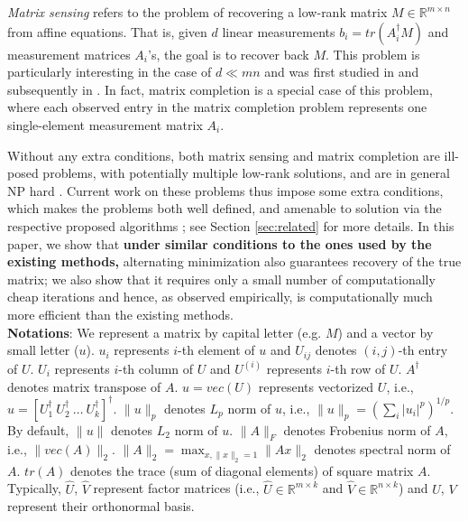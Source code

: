 \documentclass[11pt]{article}
\theoremstyle{plain}
\theoremstyle{definition}
\begin{document}
{\em Matrix sensing} refers to the problem of recovering a low-rank matrix $M\in \mathbb{R}^{m\times n}$ from affine equations. That is, given $d$ linear measurements $b_i = tr(A_i^\dag M)$ and measurement matrices $A_i$'s, the goal is to recover back $M$. This problem is particularly interesting in the case of $d\ll mn$ and was first studied in \cite{RechtFP2007} and subsequently in \cite{JainMD10, LeeB10}. In fact,  matrix completion is a special case of this problem, where each observed entry in the matrix completion problem  represents one single-element measurement matrix $A_i$. 

Without any extra conditions, both  matrix sensing and matrix completion are ill-posed problems, with potentially multiple low-rank solutions, and are in general NP hard \cite{MekaJCD2008}. Current work on these problems thus impose some extra conditions, which  makes the problems both well defined, and amenable to solution via the respective proposed algorithms \cite{RechtFP2007, CandesR2007}; see Section \ref{sec:related} for more details. In this paper, we show that {\bf under similar conditions to the ones used by the existing methods,} alternating minimization also guarantees recovery of the true matrix; we also show that it requires only a small number of computationally cheap iterations and hence, as observed empirically, is computationally much more efficient than the existing methods. \\
{\bf Notations}: We represent a matrix by capital letter (e.g. $M$) and a vector by small letter ($u$). $u_i$ represents $i$-th element of $u$ and $U_{ij}$ denotes $(i,j)$-th entry of $U$. $U_i$ represents $i$-th column of $U$ and $U^{(i)}$ represents $i$-th row of $U$. $A^\dag$ denotes matrix transpose of $A$. $u=vec(U)$ represents vectorized $U$, i.e., $u=[U_1^\dag\ U_2^\dag\ \dots\ U_k^\dag]^\dag$.  $\|u\|_p$ denotes $L_p$ norm of $u$, i.e., $\|u\|_p=(\sum_i|u_i|^p)^{1/p}$. By default, $\|u\|$ denotes $L_2$ norm of $u$. $\|A\|_F$ denotes Frobenius norm of $A$, i.e., $\|vec(A)\|_2$. $\|A\|_2=\max_{x, \|x\|_2=1} \|Ax\|_2$ denotes spectral norm of $A$. $tr(A)$ denotes the trace (sum of diagonal elements) of square matrix $A$. Typically, $\widehat{U}$, $\widehat{V}$ represent factor matrices (i.e., $\widehat{U}\in \mathbb{R}^{m\times k}$ and $\widehat{V}\in \mathbb{R}^{n\times k}$) and $U$, $V$ represent their orthonormal basis.
\end{document}
